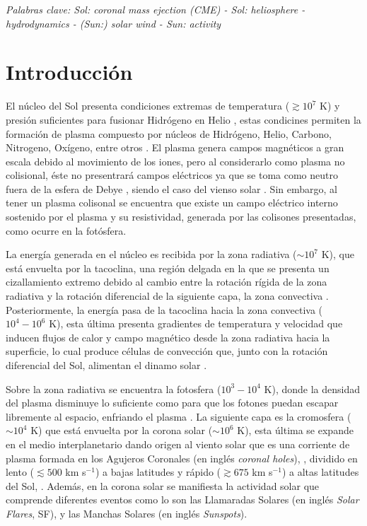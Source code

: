 \textit{Palabras clave:  Sol: coronal mass ejection (CME) - Sol: heliosphere - hydrodynamics - (Sun:) solar wind - Sun: activity}

\section{Introducción}
El núcleo del Sol presenta condiciones extremas de temperatura ($\gtrsim 10^{7}$ K) y presión suficientes para fusionar Hidrógeno en Helio \parencite[e.g.,][]{fiorentini-2004}, estas condicines permiten la formación de plasma \parencite[e.g.,][]{Gray_2005} compuesto por núcleos de Hidrógeno, Helio, Carbono, Nitrogeno, Oxígeno, entre otros \parencite[e.g.,][]{asplund-2009}. El plasma genera campos magnéticos a gran escala debido al movimiento de los iones, pero al considerarlo como plasma no colisional, éste no presentrará campos eléctricos ya que se toma como neutro fuera de la esfera de Debye \parencite[e.g.,][]{judge-2020}, siendo el caso del vienso solar \parencite[e.g.,][]{artemyev-2018}. Sin embargo, al tener un plasma colisonal se encuentra que existe un campo eléctrico interno sostenido por el plasma y su resistividad, generada por las colisones presentadas, como ocurre en la fotósfera. 

La energía generada en el núcleo es recibida por la zona radiativa ($\sim 10^{7}$ K), que está envuelta por la tacoclina, una región delgada en la que se presenta un cizallamiento extremo debido al cambio entre la rotación rígida de la zona radiativa y la rotación diferencial de la siguiente capa, la zona convectiva \parencite[e.g.,][]{strugarek-2023}. Posteriormente, la energía pasa de la tacoclina hacia la zona convectiva ($10^{4}-10^{6}$ K), esta última presenta gradientes de temperatura y velocidad que inducen flujos de calor y campo magnético desde la zona radiativa hacia la superficie, lo cual produce células de convección \parencite[e.g.,][]{stein-2012} que, junto con la rotación diferencial del Sol, alimentan el dinamo solar \parencite[e.g.,][]{ossendrijver-2003}. 

Sobre la zona radiativa se encuentra la fotosfera ($10^{3}-10^{4}$ K), donde la densidad del plasma disminuye lo suficiente como para que los fotones puedan escapar libremente al espacio, enfriando el plasma \parencite[e.g.,][]{wilson-1969}. La siguiente capa es la cromosfera ($\sim10^{4}$ K) que está envuelta por la corona solar ($\sim 10^{6}$ K), esta última se expande en el medio interplanetario dando origen al viento solar que es una corriente de plasma formada en los Agujeros Coronales (en inglés \textit{coronal holes}), \parencite[e.g.,][]{schwenn-2007, cranmer-2009, cranmer-2019}, dividido en lento ($\lesssim 500$ km s$^{-1}$) a bajas latitudes y rápido ($\gtrsim675$ km s$^{-1}$) a altas latitudes del Sol, \parencite[e.g.,][]{stakhiv-2015}. Además, en la corona solar se manifiesta la actividad solar que comprende diferentes eventos como lo son las Llamaradas Solares (en inglés \textit{Solar Flares}, SF), \parencite[e.g.,][]{1969ARA&A...7..149S, schrijver-2008} y las Manchas Solares (en inglés \textit{Sunspots}).


